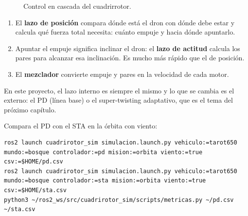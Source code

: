\begin{figure}[H]
\centering
{}
\caption{Control en cascada del cuadrirrotor.}
\label{fig:cascada}
\end{figure}

\begin{enumerate}
  \item El \textbf{lazo de posición} compara dónde está el dron con dónde debe estar y calcula qué
        fuerza total necesita: cuánto empuje y hacia dónde apuntarlo.
  \item Apuntar el empuje significa inclinar el dron: el \textbf{lazo de actitud} calcula los pares
        para alcanzar esa inclinación. Es mucho más rápido que el de posición.
  \item El \textbf{mezclador} convierte empuje y pares en la velocidad de cada motor.
\end{enumerate}
En este proyecto, el lazo interno es siempre el mismo y lo que se cambia es el externo: el PD
(línea base) o el super-twisting adaptativo, que es el tema del próximo capítulo.

\begin{ejercicio}
Compara el PD con el STA en la órbita con viento:
\begin{lstlisting}[style=bash]
ros2 launch cuadrirotor_sim simulacion.launch.py vehiculo:=tarot650 mundo:=bosque controlador:=pd mision:=orbita viento:=true csv:=$HOME/pd.csv
ros2 launch cuadrirotor_sim simulacion.launch.py vehiculo:=tarot650 mundo:=bosque controlador:=sta mision:=orbita viento:=true csv:=$HOME/sta.csv
python3 ~/ros2_ws/src/cuadrirotor_sim/scripts/metricas.py ~/pd.csv ~/sta.csv
\end{lstlisting}
\end{ejercicio}
